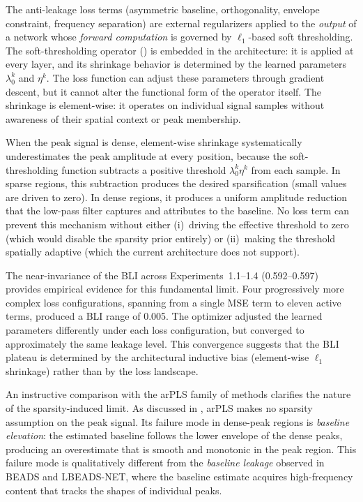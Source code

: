 The anti-leakage loss terms (asymmetric baseline, orthogonality, envelope constraint, frequency separation) are external regularizers applied to the \emph{output} of a network whose \emph{forward computation} is governed by $\ell_1$-based soft thresholding. The soft-thresholding operator () is embedded in the architecture: it is applied at every layer, and its shrinkage behavior is determined by the learned parameters $\lambda_0^k$ and $\eta^k$. The loss function can adjust these parameters through gradient descent, but it cannot alter the functional form of the operator itself. The shrinkage is element-wise: it operates on individual signal samples without awareness of their spatial context or peak membership.

When the peak signal is dense, element-wise shrinkage systematically underestimates the peak amplitude at every position, because the soft-thresholding function subtracts a positive threshold $\lambda_0^k \eta^k$ from each sample. In sparse regions, this subtraction produces the desired sparsification (small values are driven to zero). In dense regions, it produces a uniform amplitude reduction that the low-pass filter captures and attributes to the baseline. No loss term can prevent this mechanism without either (i)~driving the effective threshold to zero (which would disable the sparsity prior entirely) or (ii)~making the threshold spatially adaptive (which the current architecture does not support).

The near-invariance of the BLI across Experiments~1.1--1.4 (0.592--0.597) provides empirical evidence for this fundamental limit. Four progressively more complex loss configurations, spanning from a single MSE term to eleven active terms, produced a BLI range of 0.005. The optimizer adjusted the learned parameters differently under each loss configuration, but converged to approximately the same leakage level. This convergence suggests that the BLI plateau is determined by the architectural inductive bias (element-wise $\ell_1$ shrinkage) rather than by the loss landscape.

An instructive comparison with the arPLS family of methods clarifies the nature of the sparsity-induced limit. As discussed in , arPLS makes no sparsity assumption on the peak signal. Its failure mode in dense-peak regions is \emph{baseline elevation}: the estimated baseline follows the lower envelope of the dense peaks, producing an overestimate that is smooth and monotonic in the peak region. This failure mode is qualitatively different from the \emph{baseline leakage} observed in BEADS and LBEADS-NET, where the baseline estimate acquires high-frequency content that tracks the shapes of individual peaks.

